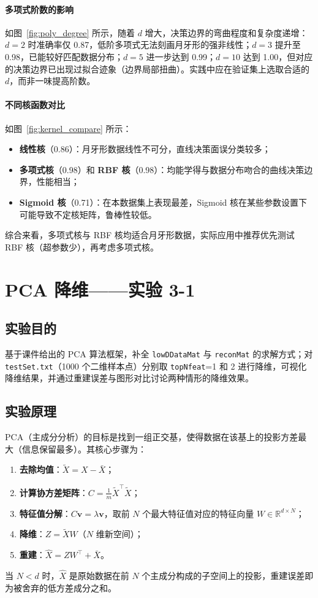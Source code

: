\documentclass[10.5pt]{config}
\begin{document}
\paragraph{多项式阶数的影响}
如图~\ref{fig:poly_degree} 所示，随着 $d$ 增大，决策边界的弯曲程度和复杂度递增：$d=2$ 时准确率仅 0.87，低阶多项式无法刻画月牙形的强非线性；$d=3$ 提升至 0.98，已能较好匹配数据分布；$d=5$ 进一步达到 0.99；$d=10$ 达到 1.00，但对应的决策边界已出现过拟合迹象（边界局部扭曲）。实践中应在验证集上选取合适的 $d$，而非一味提高阶数。

\paragraph{不同核函数对比}
如图~\ref{fig:kernel_compare} 所示：
\begin{itemize}
    \item \textbf{线性核}（0.86）：月牙形数据线性不可分，直线决策面误分类较多；
    \item \textbf{多项式核}（0.98）和 \textbf{RBF 核}（0.98）：均能学得与数据分布吻合的曲线决策边界，性能相当；
    \item \textbf{Sigmoid 核}（0.71）：在本数据集上表现最差，Sigmoid 核在某些参数设置下可能导致不定核矩阵，鲁棒性较低。
\end{itemize}
综合来看，多项式核与 RBF 核均适合月牙形数据，实际应用中推荐优先测试 RBF 核（超参数少），再考虑多项式核。

\clearpage
\section{PCA 降维——实验 3-1}

\subsection{实验目的}
基于课件给出的 PCA 算法框架，补全 \texttt{lowDDataMat} 与 \texttt{reconMat} 的求解方式；对 \texttt{testSet.txt}（1000 个二维样本点）分别取 \texttt{topNfeat}=1 和 2 进行降维，可视化降维结果，并通过重建误差与图形对比讨论两种情形的降维效果。

\subsection{实验原理}
PCA（主成分分析）的目标是找到一组正交基，使得数据在该基上的投影方差最大（信息保留最多）。其核心步骤为：
\begin{enumerate}
    \item \textbf{去除均值}：$\tilde{X} = X - \bar{X}$；
    \item \textbf{计算协方差矩阵}：$C = \frac{1}{m}\tilde{X}^{\top}\tilde{X}$；
    \item \textbf{特征值分解}：$C\mathbf{v} = \lambda\mathbf{v}$，取前 $N$ 个最大特征值对应的特征向量 $W \in \mathbb{R}^{d\times N}$；
    \item \textbf{降维}：$Z = \tilde{X} W$（$N$ 维新空间）；
    \item \textbf{重建}：$\hat{X} = Z W^{\top} + \bar{X}$。
\end{enumerate}
当 $N < d$ 时，$\hat{X}$ 是原始数据在前 $N$ 个主成分构成的子空间上的投影，重建误差即为被舍弃的低方差成分之和。
\end{document}
